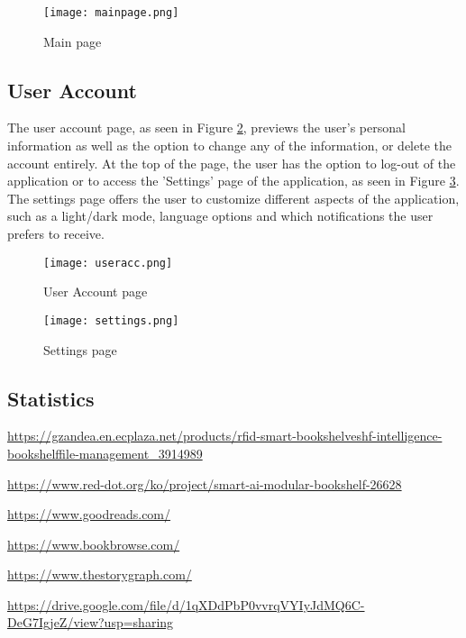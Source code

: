 \documentclass[conference]{IEEEtran}
\begin{document}
\begin{figure}[h]
    \centering
    \texttt{[image: mainpage.png]}
    \caption{Main page}
    \label{fig:mainpage}
\end{figure}

\subsection{User Account}
The user account page, as seen in Figure \ref{fig:useracc}, previews the user's personal information as well as the option to change any of the information, or delete the account entirely. At the top of the page, the user has the option to log-out of the application or to access the 'Settings' page of the application, as seen in Figure \ref{fig:settings}. \\

The settings page offers the user to customize different aspects of the application, such as a light/dark mode, language options and which notifications the user prefers to receive.


\begin{figure}[h]
    \centering
    \texttt{[image: useracc.png]}
    \caption{User Account page}
    \label{fig:useracc}
\end{figure}

\begin{figure}[h]
    \centering
    \texttt{[image: settings.png]}
    \caption{Settings page}
    \label{fig:settings}
\end{figure}

\subsection{Statistics}














\begin{thebibliography}{00}
\url{https://gzandea.en.ecplaza.net/products/rfid-smart-bookshelveshf-intelligence-bookshelffile-management_3914989}

\url{https://www.red-dot.org/ko/project/smart-ai-modular-bookshelf-26628}

\url{https://www.goodreads.com/}

\url{https://www.bookbrowse.com/}

\url{https://www.thestorygraph.com/}

\url{https://drive.google.com/file/d/1qXDdPbP0vvrqVYIyJdMQ6C-DeG7IgjeZ/view?usp=sharing}

\end{thebibliography}
\end{document}
